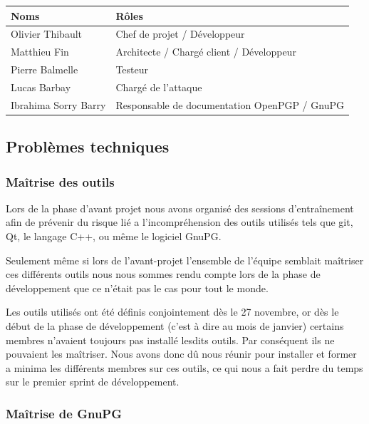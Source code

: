 \documentclass{../res/univ-projet}
\begin{document}
    \begin{tabular}{|l|l|}
      \hline
      \bfseries{Noms}      & \bfseries{Rôles}                             \\
      \hline
      Olivier Thibault     & Chef de projet / Développeur                 \\
      Matthieu Fin         & Architecte / Chargé client / Développeur     \\
      Pierre Balmelle      & Testeur                                      \\
      Lucas Barbay         & Chargé de l'attaque                          \\
      Ibrahima Sorry Barry & Responsable de documentation OpenPGP / GnuPG \\
      \hline

    \end{tabular}

    
  \subsection{Problèmes techniques}

    \subsubsection{Maîtrise des outils}

      Lors de la phase d'avant projet nous avons organisé des sessions d’entraînement afin
      de prévenir du risque lié a l’incompréhension des outils utilisés tels que git, Qt, le langage C++,
      ou même le logiciel GnuPG.

      Seulement même si lors de l'avant-projet l'ensemble de l'équipe semblait maîtriser ces
      différents outils nous nous sommes rendu compte lors de la phase de développement que ce n'était pas le cas
      pour tout le monde.

      Les outils utilisés ont été définis conjointement dès le 27 novembre, or dès le début de la phase de développement
      (c'est à dire au mois de janvier) certains membres n'avaient toujours pas installé lesdits outils. Par conséquent
      ils ne pouvaient les maîtriser. Nous avons donc dû nous réunir pour installer et former a minima les différents membres
      sur ces outils, ce qui nous a fait perdre du temps sur le premier sprint de développement.

    \subsubsection{Maîtrise de GnuPG}
    
\end{document}

